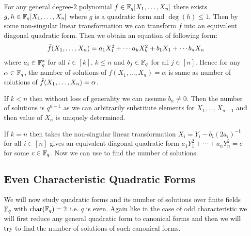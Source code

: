 \begin{note}
  For any general degree-$2$ polynomial $f\in\mathbb{F}_q[X_1,\dots,X_n]$ there exists $g,h\in\mathbb{F}_q[X_1,\dots,X_n]$ where $g$ is a quadratic form and $\deg(h)\leq 1$. Then by some non-singular linear transformation we can transform $f$ into an equivalent diagonal quadratic form. Then we obtain an equation of following form:
  $$\tilde{f}(X_1,\dots, X_n)=a_1X_1^2+\cdots a_kX_k^2+b_1X_1+\cdots b_nX_n$$ where $a_i\in\mathbb{F}_q^*$ for all $i\in[k]$, $k\leq n$ and $b_j\in\mathbb{F}_q$ for all $j\in[n]$. Hence for any $\alpha\in\mathbb{F}_q$, the number of solutions of $f(X_1,\dots, X_n)=\alpha$ is same as number of solutions of $\tilde{f}(X_1,\dots, X_n)=\alpha$. 

  If $k<n$ then without loss of generality we can assume $b_n\neq 0$. Then the number of solutions is $q^{n-1}$ as we can arbitrarily substitute elements for $X_1,\dots, X_{n-1}$ and then value of $X_n$ is uniquely determined. 
  
  If $k=n$ then takes the non-singular linear transformation $X_i=Y_i-b_i(2a_i)^{-1}$ for all $i\in[n]$ gives an equivalent diagonal quadratic form $a_1Y_1^2+\cdots +a_nY_n^2=c$ for some $c\in\mathbb{F}_q$. Now we can use \QFCountOddthm to find the number of solutions. 
\end{note}

\subsection{Even Characteristic Quadratic Forms}
%
We will now study quadratic forms and its number of solutions over finite fields $\mathbb{F}_q$ with $\operatorname{char}(\mathbb{F}_q)=2$ i.e. $q$ is even. Again like in the case of odd characteristic we will first reduce any general quadratic form to canonical forms and then we will try to find the number of solutions of such canonical forms. 

